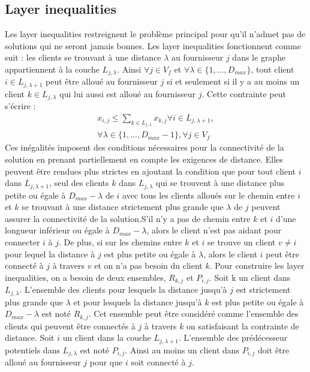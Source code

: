 \documentclass[letterpaper]{article}
\begin{document}
\subsection{Layer inequalities}
Les layer inequalities restreignent le problème principal pour qu'il n'admet pas de solutions qui ne seront jamais bonnes. Les layer inequalities fonctionnent comme suit : les clients se trouvant à une distance $\lambda$ au fournisseur $j$ dans le graphe appartiennent à la couche $L_{j,\lambda}$. Ainsi $\forall j \in V_{f}$ et $\forall \lambda \in \{1,...,D_{max} \}$, tout client $i \in L_{j,\lambda + 1}$ peut être alloué au fournisseur $j$ si et seulement si il y a au moins un client $k \in L_{j,\lambda}$ qui lui aussi est alloué au fournisseur $j$. Cette contrainte peut s'écrire : 
\begin{align*}
x_{i,j} \leq \sum_{k \in L_{j,\lambda} }{x_{k,j}} \forall i \in L_{j,\lambda +1},\\ \forall \lambda \in \{ 1,...,D_{max}-1 \}, \forall j \in V_{f}
\end{align*}
Ces inégalités imposent des conditions nécessaires pour la connectivité de la solution en prenant partiellement en compte les exigences de distance. Elles peuvent être rendues plus strictes en ajoutant la condition que pour tout client $i$ dans $L_{j,\lambda +1}$, seul des clients $k$ dans $L_{j,\lambda}$ qui se trouvent à une distance plus petite ou égale à $D_{max}-\lambda$ de $i$ avec tous les clients alloués sur le chemin entre $i$ et $k$ se trouvant à une distance strictement plus grande que $\lambda$ de $j$ peuvent assurer la connectivité de la solution.S'il n'y a pas de chemin entre $k$ et $i$ d'une longueur inférieur ou égale à $D_{max}-\lambda$, alors le client n'est pas aidant pour connecter $i$ à $j$. De plus, si sur les chemins entre $k$ et $i$ se trouve un client $v \neq i$ pour lequel la distance à $j$ est plus petite ou égale à $\lambda$, alors le client $i$ peut être connecté à $j$ à travers $v$ et on n'a pas besoin du client $k$.\newline \indent
Pour construire les layer inequalities, on a besoin de deux ensembles, $R_{k,j}$ et $P_{i,j}$. Soit k un client dans $L_{j,\lambda}$. L'ensemble des clients pour lesquels la distance jusqu'à $j$ est strictement plus grande que $\lambda$ et pour lesquels la distance jusqu'à $k$ est plus petite ou égale à $D_{max}-\lambda$ est noté $R_{k,j}$. Cet ensemble peut être considéré comme l'ensemble des clients qui peuvent être connectés à $j$ à travers $k$ on satisfaisant la contrainte de distance. Soit $i$ un client dans la couche $L_{j,\lambda +1}$. L'ensemble des prédécesseur potentiels dans $L_{j,\lambda}$ est noté $P_{i,j}$. Ainsi au moins un client dans $P_{i,j}$ doit être alloué au fournisseur $j$ pour que $i$ soit connecté à $j$.\newline\indent
\end{document}
